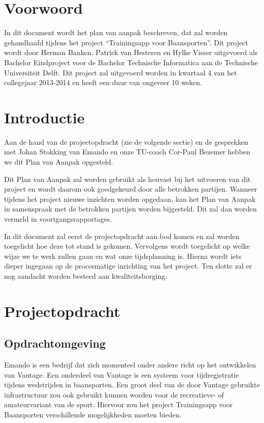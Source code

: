 \section{Voorwoord}
In dit document wordt het plan van aanpak beschreven, dat zal worden gehandhaafd tijdens het project “Trainingsapp voor Baansporten”. Dit project wordt door Herman Banken, Patrick van Hesteren en Hylke Visser uitgevoerd als Bachelor Eindproject voor de Bachelor Technische Informatica aan de Technische Universiteit Delft. Dit project zal uitgevoerd worden in kwartaal 4 van het collegejaar 2013-2014 en heeft een duur van ongeveer 10 weken.

\section{Introductie}


Aan de hand van de projectopdracht (zie de volgende sectie) en de gesprekken met Johan Stokking van Emando en onze TU-coach Cor-Paul Bezemer hebben we dit Plan van Aanpak opgesteld.

Dit Plan van Aanpak zal worden gebruikt als houvast bij het uitvoeren van dit project en wordt daarom ook goedgekeurd door alle betrokken partijen. Wanneer tijdens het project nieuwe inzichten worden opgedaan, kan het Plan van Aanpak in samenspraak met de betrokken partijen worden bijgesteld. Dit zal dan worden vermeld in voortgangsrapportages.

In dit document zal eerst de projectopdracht aan bod komen en zal worden toegelicht hoe deze tot stand is gekomen. Vervolgens wordt toegelicht op welke wijze we te werk zullen gaan en wat onze tijdsplanning is. Hierna wordt iets dieper ingegaan op de procesmatige inrichting van het project. Ten slotte zal er nog aandacht worden besteed aan kwaliteitsborging.

\section{Projectopdracht}
\subsection{Opdrachtomgeving}
Emando is een bedrijf dat zich momenteel onder andere richt op het ontwikkelen van Vantage. Een onderdeel van Vantage is een systeem voor tijdregistratie tijdens wedstrijden in baansporten. Een groot deel van de door Vantage gebruikte infrastructuur zou ook gebruikt kunnen worden voor de recreatieve- of amateurvariant van de sport. Hiervoor zou het project Trainingsapp voor Baansporten verschillende mogelijkheden moeten bieden.


